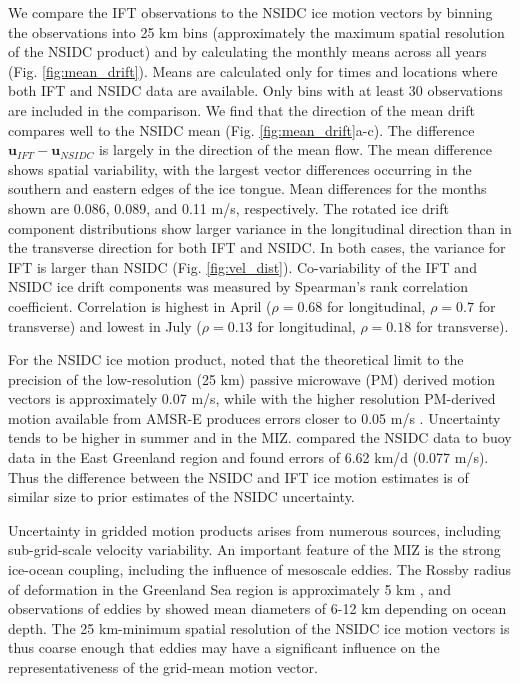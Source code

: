 \documentclass[aog]{igs}
\begin{document}
We compare the IFT observations to the NSIDC ice motion vectors by binning the observations into 25 km bins (approximately the maximum spatial resolution of the NSIDC product) and by calculating the monthly means across all years (Fig. \ref{fig:mean_drift}). Means are calculated only for times and locations where both IFT and NSIDC data are available. Only bins with at least 30 observations are included in the comparison. We find that the direction of the mean drift compares well to the NSIDC mean (Fig. \ref{fig:mean_drift}a-c). The difference $\mathbf{u}_{IFT} - \mathbf{u}_{NSIDC}$ is largely in the direction of the mean flow. The mean difference shows spatial variability, with the largest vector differences occurring in the southern and eastern edges of the ice tongue. Mean differences for the months shown are 0.086, 0.089, and 0.11 m/s, respectively. 
The rotated ice drift component distributions show larger variance in the longitudinal direction than in the transverse direction for both IFT and NSIDC. In both cases, the variance for IFT is larger than NSIDC (Fig. \ref{fig:vel_dist}). Co-variability of the IFT and NSIDC ice drift components was measured by Spearman's rank correlation coefficient. Correlation is highest in April ($\rho=0.68$ for longitudinal, $\rho=0.7$ for transverse) and lowest in July ($\rho=0.13$ for longitudinal, $\rho=0.18$ for transverse).

For the NSIDC ice motion product, \cite{tschudi2020_EnhancementSea} noted that the theoretical limit to the precision of the low-resolution (25 km) passive microwave (PM) derived motion vectors is approximately 0.07 m/s, while with the higher resolution PM-derived motion available from AMSR-E produces errors closer to 0.05 m/s \citep{meier2006_HighresolutionSeaice}. Uncertainty tends to be higher in summer and in the MIZ. \cite{wang2022_IntercomparisonSatellite} compared the NSIDC data to buoy data in the East Greenland region and found errors of 6.62 km/d (0.077 m/s). Thus the difference between the NSIDC and IFT ice motion estimates is of similar size to prior estimates of the NSIDC uncertainty.

Uncertainty in gridded motion products arises from numerous sources, including sub-grid-scale velocity variability. An important feature of the MIZ is the strong ice-ocean coupling, including the influence of mesoscale eddies. The Rossby radius of deformation in the Greenland Sea region is approximately 5 km \citep{nurser2014_RossbyRadius}, and observations of eddies by \cite{kozlov2021_EddiesMarginal} showed mean diameters of 6-12 km depending on ocean depth. The 25 km-minimum spatial resolution of the NSIDC ice motion vectors is thus coarse enough that eddies may have a significant influence on the representativeness of the grid-mean motion vector. 
\end{document}
